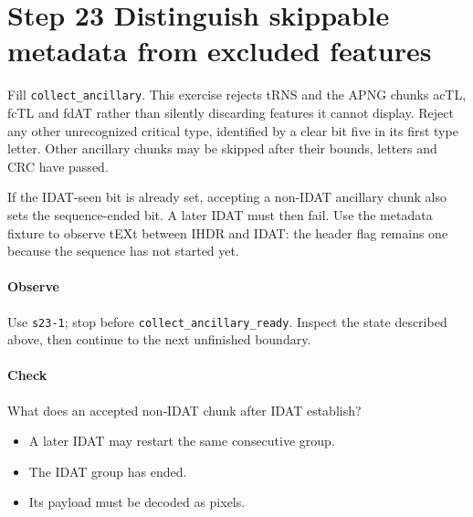 \section{Step 23 Distinguish skippable metadata from excluded features}\label{png-collect-s23}
Fill \texttt{collect\_ancillary}. This exercise rejects tRNS and the APNG chunks acTL, fcTL and fdAT rather than silently discarding features it cannot display. Reject any other unrecognized critical type, identified by a clear bit five in its first type letter. Other ancillary chunks may be skipped after their bounds, letters and CRC have passed.

If the IDAT-seen bit is already set, accepting a non-IDAT ancillary chunk also sets the sequence-ended bit. A later IDAT must then fail. Use the metadata fixture to observe tEXt between IHDR and IDAT: the header flag remains one because the sequence has not started yet.

\paragraph{Observe} Use \texttt{s23-1}; stop before \texttt{collect\_ancillary\_ready}. Inspect the state described above, then continue to the next unfinished boundary.

\paragraph{Check} What does an accepted non-IDAT chunk after IDAT establish?
\begin{itemize}
  \item[A.] A later IDAT may restart the same consecutive group.
  \item[B.] The IDAT group has ended.
  \item[C.] Its payload must be decoded as pixels.
\end{itemize}
